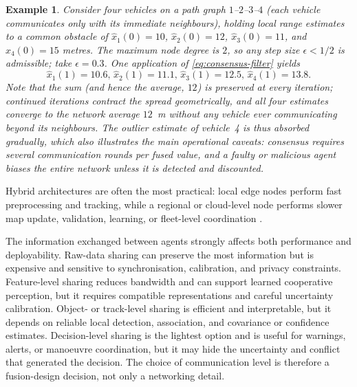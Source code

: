 \documentclass{ieeeaccess}
\newtheorem{example}{Example}
\begin{document}
{\color{RevisionOlive}
\begin{example}
Consider four vehicles on a path graph $1$--$2$--$3$--$4$ (each vehicle communicates only with its immediate neighbours), holding local range estimates to a common obstacle of $\widehat{x}_1(0)=10$, $\widehat{x}_2(0)=12$, $\widehat{x}_3(0)=11$, and $\widehat{x}_4(0)=15$ metres. The maximum node degree is $2$, so any step size $\epsilon<1/2$ is admissible; take $\epsilon=0.3$. One application of \eqref{eq:consensus-filter} yields
\begin{equation*}
\widehat{x}_1(1)=10.6,\,
\widehat{x}_2(1)=11.1,\,
\widehat{x}_3(1)=12.5,\,
\widehat{x}_4(1)=13.8.
\end{equation*}
Note that the sum (and hence the average, $12$) is preserved at every iteration; continued iterations contract the spread geometrically, and all four estimates converge to the network average $12$~m without any vehicle ever communicating beyond its neighbours. The outlier estimate of vehicle~4 is thus absorbed gradually, which also illustrates the main operational caveats: consensus requires several communication rounds per fused value, and a faulty or malicious agent biases the entire network unless it is detected and discounted.
\end{example}
}

Hybrid architectures are often the most practical: local edge nodes perform fast preprocessing and tracking, while a regional or cloud-level node performs slower map update, validation, learning, or fleet-level coordination \cite{deng_edge_2021,lim_federated_2020}.

The information exchanged between agents strongly affects both performance and deployability. Raw-data sharing can preserve the most information but is expensive and sensitive to synchronisation, calibration, and privacy constraints. Feature-level sharing reduces bandwidth and can support learned cooperative perception, but it requires compatible representations and careful uncertainty calibration. Object- or track-level sharing is efficient and interpretable, but it depends on reliable local detection, association, and covariance or confidence estimates. Decision-level sharing is the lightest option and is useful for warnings, alerts, or manoeuvre coordination, but it may hide the uncertainty and conflict that generated the decision. The choice of communication level is therefore a fusion-design decision, not only a networking detail.
\end{document}
